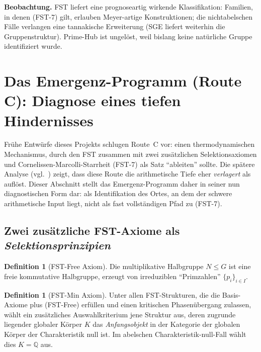 \documentclass[11pt,a4paper]{article}
\theoremstyle{plain}
\theoremstyle{definition}
\newtheorem{definition}[theorem]{Definition}
\newcommand{\Q}{\mathbb{Q}}
\begin{document}
\textbf{Beobachtung.} FST liefert eine prognoseartig wirkende Klassifikation:
Familien, in denen (FST-7) gilt, erlauben Meyer-artige Konstruktionen; die
nichtabelschen Fälle verlangen eine tannakische Erweiterung (SGE liefert
weiterhin die Gruppenstruktur). Prime-Hub ist ungelöst, weil bislang keine
natürliche Gruppe identifiziert wurde.

\section{Das Emergenz-Programm (Route C): Diagnose eines tiefen Hindernisses}
\label{sec:emergence}

Frühe Entwürfe dieses Projekts schlugen Route~C vor: einen thermodynamischen
Mechanismus, durch den FST zusammen mit zwei zusätzlichen Selektionsaxiomen
und Cornelissen-Marcolli-Starrheit (FST-7) als Satz ``ableiten'' sollte.
Die spätere Analyse (vgl.~\cite{L1KAttack,EmergenceAttack}) zeigt, dass
diese Route die arithmetische Tiefe eher \emph{verlagert} als auflöst.
Dieser Abschnitt stellt das Emergenz-Programm daher in seiner nun
diagnostischen Form dar: als Identifikation des Ortes, an dem der schwere
arithmetische Input liegt, nicht als fast vollständigen Pfad zu (FST-7).

\subsection{Zwei zusätzliche FST-Axiome als \emph{Selektionsprinzipien}}
\label{sec:extra-axioms}

\begin{definition}[FST-Free Axiom]\label{def:fst-free}
Die multiplikative Halbgruppe $N \le G$ ist eine freie kommutative
Halbgruppe, erzeugt von irreduziblen ``Primzahlen'' $\{p_i\}_{i \in I}$.
\end{definition}

\begin{definition}[FST-Min Axiom]\label{def:fst-min}
Unter allen FST-Strukturen, die die Basis-Axiome plus
(FST-Free) erfüllen und einen kritischen Phasenübergang zulassen,
wählt ein zusätzliches Auswahlkriterium jene Struktur aus, deren zugrunde liegender
globaler Körper $K$ das \emph{Anfangsobjekt} in der Kategorie der globalen
Körper der Charakteristik null ist. Im abelschen Charakteristik-null-Fall
wählt dies $K = \Q$ aus.
\end{definition}
\end{document}
